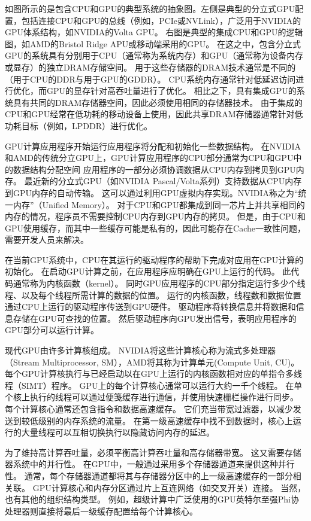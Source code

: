 如图所示的是包含CPU和GPU的典型系统的抽象图。左侧是典型的分立式GPU配置，包括连接CPU和GPU的总线（例如，PCIe或NVLink），广泛用于NVIDIA的GPU体系结构，如NVIDIA的Volta GPU。
右图是典型的集成CPU和GPU的逻辑图，如AMD的Bristol Ridge APU或移动端采用的GPU。
在这之中，包含分立式GPU的系统具有分别用于CPU（通常称为系统内存）和GPU（通常称为设备内存或显存）的独立DRAM存储空间。
用于这些存储器的DRAM技术通常是不同的（用于CPU的DDR与用于GPU的GDDR）。
CPU系统内存通常针对低延迟访问进行优化，而GPU的显存针对高吞吐量进行了优化。
相比之下，具有集成GPU的系统具有共同的DRAM存储器空间，因此必须使用相同的存储器技术。
由于集成的CPU和GPU经常在低功耗的移动设备上使用，因此共享DRAM存储器通常针对低功耗目标（例如，LPDDR）进行优化。

GPU计算应用程序开始运行应用程序将分配和初始化一些数据结构。
在NVIDIA和AMD的传统分立GPU上，GPU计算应用程序的CPU部分通常为CPU和GPU中的数据结构分配空间
应用程序的一部分必须协调数据从CPU内存到拷贝到GPU内存。 
最近新的分立式GPU（如NVIDIA Pascal/Volta系列）支持数据从CPU内存到GPU内存的自动传输。
这可以通过利用GPU虚拟内存实现。NVIDIA称之为“统一内存”（Unified Memory）。
对于CPU和GPU都集成到同一芯片上并共享相同的内存的情况，程序员不需要控制CPU内存到GPU内存的拷贝。
但是，由于CPU和GPU使用缓存，而其中一些缓存可能是私有的，因此可能存在Cache一致性问题，需要开发人员来解决。

在当前GPU系统中，CPU在其运行的驱动程序的帮助下完成对应用在GPU计算的初始化。
在启动GPU计算之前，在应用程序应明确在GPU上运行的代码。 
此代码通常称为内核函数（kernel）。 
同时GPU应用程序的CPU部分指定运行多少个线程、以及每个线程所需计算的数据的位置。
运行的内核函数，线程数和数据位置通过CPU上运行的驱动程序传送到GPU硬件。 
驱动程序将转换信息并将数据和信息存储在GPU可查找的位置。 
然后驱动程序向GPU发出信号，表明应用程序的GPU部分可以运行计算。

现代GPU由许多计算核组成。 
NVIDIA将这些计算核心称为流式多处理器（Stream Multiprocessor, SM），AMD将其称为计算单元(Compute Unit, CU)。 
每个GPU计算核执行与已经启动以在GPU上运行的内核函数相对应的单指令多线程（SIMT）程序。 
GPU上的每个计算核心通常可以运行大约一千个线程。 
在单个核上执行的线程可以通过便笺缓存进行通信，并使用快速栅栏操作进行同步。 
每个计算核心通常还包含指令和数据高速缓存。 
它们充当带宽过滤器，以减少发送到较低级别的内存系统的流量。 
在第一级高速缓存中找不到数据时，核心上运行的大量线程可以互相切换执行以隐藏访问内存的延迟。

为了维持高计算吞吐量，必须平衡高计算吞吐量和高存储器带宽。
这又需要存储器系统中的并行性。
在GPU中，一般通过采用多个存储器通道来提供这种并行性。
通常，每个存储器通道都将其与存储器分区中的上一级高速缓存的一部分相关联。 
GPU计算核心和内存分区通过片上互连网络（如交叉开关）连接。
当然，也有其他的组织结构类型。
例如，超级计算中广泛使用的GPU英特尔至强Phi协处理器则直接将最后一级缓存配置给每个计算核心。


